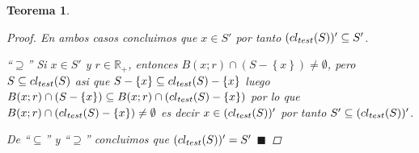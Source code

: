 \documentclass[oneside]{book} %
\theoremstyle{Teorema}
\newtheorem{Teorema}[Definicion]{Teorema}
\theoremstyle{Ejemplos}
\theoremstyle{[Obs]}
\def \test {test}
\newcommand{\cerradura}[2][\test]{\ifx \test #1 {\overline{#2}} \else {cl_{#1}(#2)} \fi} %
\renewcommand{\{}{\left\lbrace} %
\renewcommand{\}}{\right\rbrace} %
\newcommand{\n}{\cap} %
\renewcommand{\sc}{\subseteq} %
\newcommand{\R}{\mathbb{R}} %
\renewcommand{\qed}{$\blacksquare$} %
\begin{document}
\begin{Teorema}
\begin{proof}
					En ambos casos concluimos que $x \in S'$ por tanto $(\cerradura{S})' \sc S'$.
	
					``$\supseteq$'' Si $x \in S'$ y $r \in \R_{+}$, entonces $B(x;r) \n (S - \{ x \}) \neq \emptyset$, pero $S \sc \cerradura{S}$ asi que $S - \{ x \} \sc \cerradura{S} - \{ x \}$ luego $B(x;r) \n (S - \{ x \}) \sc B(x;r) \n (\cerradura{S} - \{ x \})$ por lo que $B(x;r) \n (\cerradura{S} - \{ x \}) \neq \emptyset$ es decir $x \in (\cerradura{S})'$ por tanto $S' \sc (\cerradura{S})'$.
	
					De ``$\sc$'' y ``$\supseteq$'' concluimos que $(\cerradura{S})' = S'$ \qed 

				\end{proof}
			
			\end{Teorema}
\end{document}
